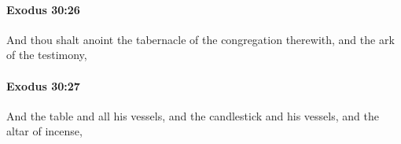 		\paragraph{Exodus 30:26} %
			\label{EXODUS-30-26}

			And thou shalt anoint the tabernacle of the congregation therewith, and the ark of the testimony,


		\paragraph{Exodus 30:27} %
			\label{EXODUS-30-27}

			And the table and all his vessels, and the candlestick and his vessels, and the altar of incense,


